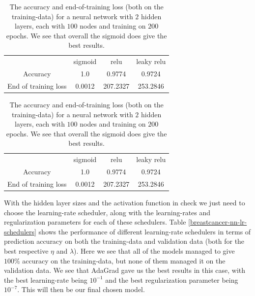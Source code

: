 \documentclass{article}
\begin{document}
\begin{table}
      \centering
      \begin{tabular}{| c | c | c | c |}
                                 & sigmoid & relu     & leaky relu \\
            Accuracy             & 1.0     & 0.9774   & 0.9724     \\
            End of training loss & 0.0012  & 207.2327 & 253.2846   \\
      \end{tabular}
      \caption{The accuracy and end-of-training loss (both on the training-data)
            for a neural network with $2$ hidden layers, each with $100$ nodes and
            training on $200$ epochs. We see that overall the sigmoid does give the
            best results.}
      \label{breastcancer-nn-activ-funcs}
\end{table}
\begin{table}
      \centering
      \begin{tabular}{| c | c | c | c |}
                                 & sigmoid & relu     & leaky relu \\
            Accuracy             & 1.0     & 0.9774   & 0.9724     \\
            End of training loss & 0.0012  & 207.2327 & 253.2846   \\
      \end{tabular}
      \caption{The accuracy and end-of-training loss (both on the training-data)
            for a neural network with $2$ hidden layers, each with $100$ nodes and
            training on $200$ epochs. We see that overall the sigmoid does give the
            best results.}
      \label{breastcancer-nn-activ-funcs}
\end{table}

With the hidden layer sizes and the activation function in check we just need to
choose the learning-rate scheduler, along with the learning-rates and
regularization parameters for each of these schedulers. Table
\ref{breastcancer-nn-lr-schedulers} shows the performance of different
learning-rate schedulers in terms of prediction accuracy on both the
training-data and validation data (both for the best respective $\eta$ and
$\lambda$). Here we see that all of the models managed to give $100\%$ accuracy
on the training-data, but none of them managed it on the validation data. We see
that AdaGrad gave us the best results in this case, with the best learning-rate
being $10^{-1}$ and the best regularization parameter being $10^{-7}$. This will
then be our final chosen model.
\end{document}
